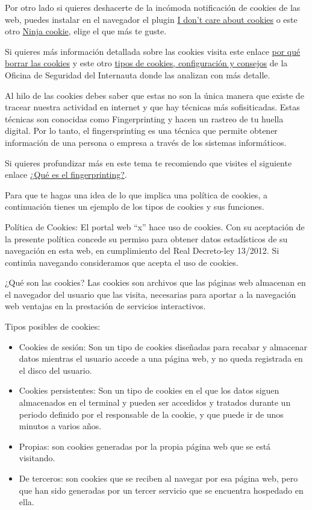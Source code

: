 \documentclass[
  a4paper,
  openany]{book}
\begin{document}
Por otro lado si quieres deshacerte de la incómoda notificación de cookies de las web, puedes instalar en el navegador el plugin \href{https://www.i-dont-care-about-cookies.eu/}{I don't care about cookies} o este otro \href{https://ninja-cookie.com/}{Ninja cookie}, elige el que más te guste.

Si quieres más información detallada sobre las cookies visita este enlace \href{https://www.osi.es/es/actualidad/blog/2019/09/11/por-que-borrar-las-cookies-del-navegador}{por qué borrar las cookies} y este otro \href{https://www.osi.es/es/actualidad/blog/2018/07/18/entre-cookies-y-privacidad}{tipos de cookies, configuración y consejos} de la Oficina de Seguridad del Internauta donde las analizan con más detalle.

Al hilo de las cookies debes saber que estas no son la única manera que existe de tracear nuestra actividad en internet y que hay técnicas más sofisiticadas. Estas técnicas son conocidas como Fingerprinting y hacen un rastreo de tu huella digital. Por lo tanto, el fingersprinting es una técnica que permite obtener información de una persona o empresa a través de los sistemas informáticos.

Si quieres profundizar más en este tema te recomiendo que visites el siguiente enlace \href{https://protecciondatos-lopd.com/empresas/fingerprinting-que-es/}{¿Qué es el fingerprinting?}.

Para que te hagas una idea de lo que implica una política de cookies, a continuación tienes un ejemplo de los tipos de cookies y sus funciones.

Política de Cookies:
El portal web ``x'' hace uso de cookies. Con su aceptación de la presente política concede su permiso para obtener datos estadísticos de su navegación en esta web, en cumplimiento del Real Decreto-ley 13/2012. Si continúa navegando consideramos que acepta el uso de cookies.

¿Qué son las cookies?
Las cookies son archivos que las páginas web almacenan en el navegador del usuario que las visita, necesarias para aportar a la navegación web ventajas en la prestación de servicios interactivos.

Tipos posibles de cookies:

\begin{itemize}
\item
  Cookies de sesión: Son un tipo de cookies diseñadas para recabar y almacenar datos mientras el usuario accede a una página web, y no queda registrada en el disco del usuario.
\item
  Cookies persistentes: Son un tipo de cookies en el que los datos siguen almacenados en el terminal y pueden ser accedidos y tratados durante un periodo definido por el responsable de la cookie, y que puede ir de unos minutos a varios años.
\item
  Propias: son cookies generadas por la propia página web que se está visitando.
\item
  De terceros: son cookies que se reciben al navegar por esa página web, pero que han sido generadas por un tercer servicio que se encuentra hospedado en ella.
\end{itemize}
\end{document}

